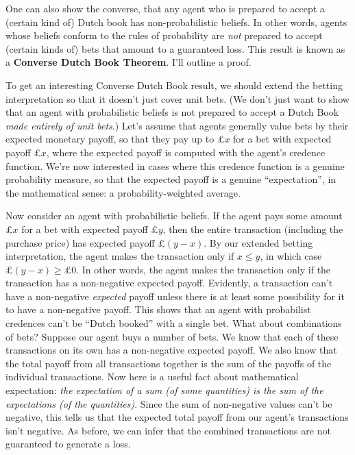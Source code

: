 One can also show the converse, that any agent who is prepared to accept a
(certain kind of) Dutch book has non-probabilistic beliefs. In other words,
agents whose beliefs conform to the rules of probability are \emph{not} prepared
to accept (certain kinds of) bets that amount to a guaranteed loss. This result
is known as a \textbf{Converse Dutch Book Theorem}. I'll outline a proof.

To get an interesting Converse Dutch Book result, we should extend the betting
interpretation so that it doesn't just cover unit bets. (We don't just want to
show that an agent with probabilistic beliefs is not prepared to accept a Dutch
Book \emph{made entirely of unit bets}.) Let's assume that agents generally
value bets by their expected monetary payoff, so that they pay up to £$x$ for a
bet with expected payoff £$x$, where the expected payoff is computed with the
agent's credence function. We're now interested in cases where this credence
function is a genuine probability measure, so that the expected payoff is a
genuine ``expectation'', in the mathematical sense: a probability-weighted
average.

Now consider an agent with probabilistic beliefs.
If the agent pays some amount £$x$ for a bet
with expected payoff £$y$, then the entire transaction (including the purchase
price) has expected payoff £$(y\!-\!x)$.
By our extended betting interpretation, the agent makes the transaction only if
$x \leq y$, in which case $£(y\!-\!x) \geq £0$. In other words, the agent makes
the transaction only if the transaction has a non-negative expected payoff.
Evidently, a transaction can't have a non-negative \emph{expected} payoff unless
there is at least some possibility for it to have a non-negative payoff. This
shows that an agent with probabilist credences can't be ``Dutch booked'' with a
single bet. What about combinations of bets? Suppose our agent buys a number of
bets. We know that each of these transactions on its own has a non-negative
expected payoff. We also know that the total payoff from all transactions
together is the sum of the payoffs of the individual transactions. Now here is a
useful fact about mathematical expectation: \emph{the expectation of a sum (of
  some quantities) is the sum of the expectations (of the quantities)}. Since
the sum of non-negative values can't be negative, this tells us that the
expected total payoff from our agent's transactions isn't negative. As before,
we can infer that the combined transactions are not guaranteed to generate a
loss.

